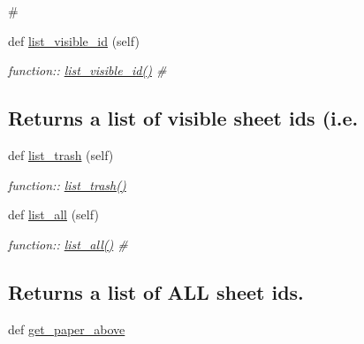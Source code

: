 \begin{DoxyCompactItemize}
\begin{DoxyCompactList}
\# \end{DoxyCompactList}\item 
def \hyperlink{classplume-creator_1_1src_1_1plume_1_1data_1_1tree_1_1db__tree_1_1_db_tree_aa6b25f6ae38e23c7d698bbdc848da66d}{list\+\_\+visible\+\_\+id} (self)
\begin{DoxyCompactList}\small\item\em function\+:\+: \hyperlink{classplume-creator_1_1src_1_1plume_1_1data_1_1tree_1_1db__tree_1_1_db_tree_aa6b25f6ae38e23c7d698bbdc848da66d}{list\+\_\+visible\+\_\+id()} \# \subsection*{Returns a list of visible sheet ids (i.\+e.}\end{DoxyCompactList}\item 
def \hyperlink{classplume-creator_1_1src_1_1plume_1_1data_1_1tree_1_1db__tree_1_1_db_tree_ab02edba9b7ea8bceb8d06a02b7f82a6c}{list\+\_\+trash} (self)\hypertarget{classplume-creator_1_1src_1_1plume_1_1data_1_1tree_1_1db__tree_1_1_db_tree_ab02edba9b7ea8bceb8d06a02b7f82a6c}{}\label{classplume-creator_1_1src_1_1plume_1_1data_1_1tree_1_1db__tree_1_1_db_tree_ab02edba9b7ea8bceb8d06a02b7f82a6c}

\begin{DoxyCompactList}\small\item\em function\+:\+: \hyperlink{classplume-creator_1_1src_1_1plume_1_1data_1_1tree_1_1db__tree_1_1_db_tree_ab02edba9b7ea8bceb8d06a02b7f82a6c}{list\+\_\+trash()} \end{DoxyCompactList}\item 
def \hyperlink{classplume-creator_1_1src_1_1plume_1_1data_1_1tree_1_1db__tree_1_1_db_tree_a72c5d9eea67024952a41885becf00712}{list\+\_\+all} (self)
\begin{DoxyCompactList}\small\item\em function\+:\+: \hyperlink{classplume-creator_1_1src_1_1plume_1_1data_1_1tree_1_1db__tree_1_1_db_tree_a72c5d9eea67024952a41885becf00712}{list\+\_\+all()} \# \subsection*{Returns a list of A\+LL sheet ids.}\end{DoxyCompactList}\item 
def \hyperlink{classplume-creator_1_1src_1_1plume_1_1data_1_1tree_1_1db__tree_1_1_db_tree_a6f90d5b780ef13503ee1ad2d5c9e9db9}{get\+\_\+paper\+\_\+above}\hypertarget{classplume-creator_1_1src_1_1plume_1_1data_1_1tree_1_1db__tree_1_1_db_tree_a6f90d5b780ef13503ee1ad2d5c9e9db9}{}\label{classplume-creator_1_1src_1_1plume_1_1data_1_1tree_1_1db__tree_1_1_db_tree_a6f90d5b780ef13503ee1ad2d5c9e9db9}


\end{DoxyCompactItemize}
